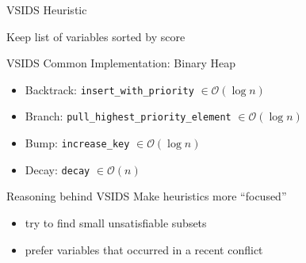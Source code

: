 \documentclass[t]{sdqbeamer}
\begin{document}
    
    \begin{frame}{VSIDS Heuristic}
    
    Keep list of variables sorted by score
    
    \begin{block}{VSIDS Common Implementation: Binary Heap}
    \begin{itemize}
    \item Backtrack: \texttt{insert\_with\_priority} $\in \mathcal{O}(\log n)$
    \item Branch: \texttt{pull\_highest\_priority\_element} $\in \mathcal{O}(\log n)$
    \item Bump: \texttt{increase\_key} $\in \mathcal{O}(\log n)$
    \item Decay: \texttt{decay} $\in \mathcal{O}(n)$
    \end{itemize}
    \end{block}
    
    \begin{block}{Reasoning behind VSIDS} Make heuristics more ``focused''
        \begin{itemize}
            \item try to find small unsatisfiable subsets
            \item prefer variables that occurred in a recent conflict
        \end{itemize}
    \end{block}
    \end{frame}
    
\end{document}

